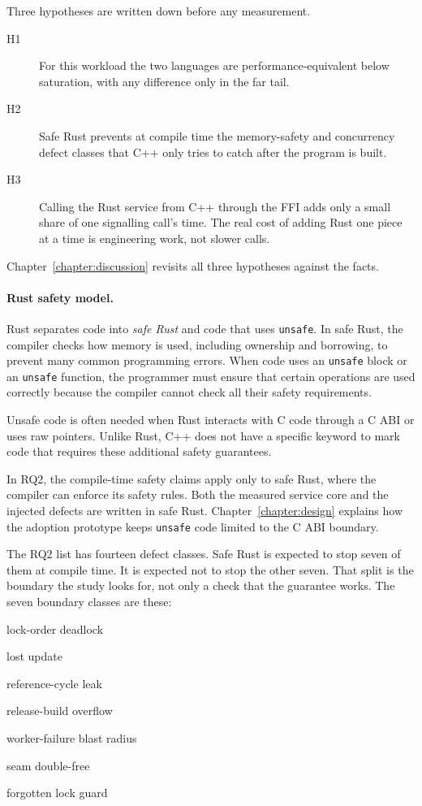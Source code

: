 \documentclass[english,oneside,a4paper,censored,csm,software-track-2020]{HYthesisML}
\begin{document}
Three hypotheses are written down before any measurement.
\begin{description}
  \item[H1] For this workload the two languages are performance-equivalent below
        saturation, with any difference only in the far tail.
  \item[H2] Safe Rust prevents at compile time the memory-safety and concurrency defect
        classes that C++ only tries to catch after the program is built.
  \item[H3] Calling the Rust service from C++ through the FFI adds only a small
        share of one signalling call's time. The real cost of adding Rust one
        piece at a time is engineering work, not slower calls.
\end{description}
Chapter~\ref{chapter:discussion} revisits all three hypotheses against the facts.

\paragraph{Rust safety model.}\label{*sec:rustsafety*}
Rust separates code into \emph{safe Rust} and code that uses \texttt{unsafe}. 
In safe Rust, the compiler checks how memory is used, including ownership and borrowing, 
to prevent many common programming errors. When code uses an \texttt{unsafe} block or an 
\texttt{unsafe} function, the programmer must ensure that certain operations are used 
correctly because the compiler cannot check all their safety requirements.

Unsafe code is often needed when Rust interacts with C code through a C ABI or uses raw 
pointers. Unlike Rust, C++ does not have a specific keyword to mark code that requires 
these additional safety guarantees.

In RQ2, the compile-time safety claims apply only to safe Rust, where the compiler can 
enforce its safety rules. Both the measured service core and the injected defects are 
written in safe Rust. Chapter~\ref{chapter:design} explains how the adoption prototype 
keeps \texttt{unsafe} code limited to the C ABI boundary.

The RQ2 list has fourteen defect classes. Safe Rust is expected to stop seven of
them at compile time. It is expected not to stop the other seven. That split is
the boundary the study looks for, not only a check that the guarantee works. The seven
boundary classes are these:
\begin{compactitem}
\item lock-order deadlock
\item lost update
\item reference-cycle leak
\item release-build overflow
\item worker-failure blast radius
\item seam double-free
\item forgotten lock guard
\end{compactitem}
\end{document}

